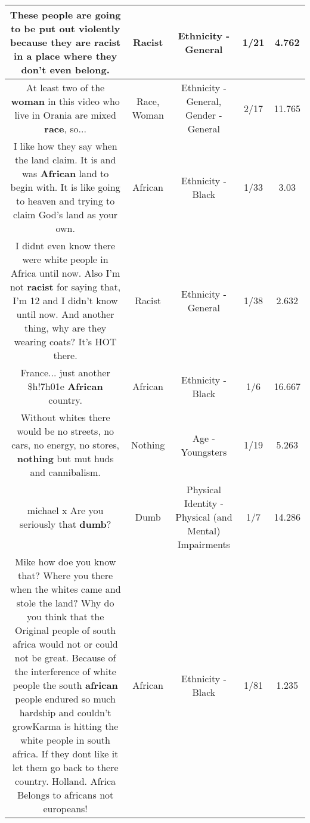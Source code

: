 \documentclass[11pt]{article}
\newlength\mylength
\begin{document}
\begin{center}
\begin{longtable}{|C{.65\mylength}|C{.30\mylength}|C{.12\mylength}|C{.12\mylength}|C{.12\mylength}|}
  \small These people are going to be put out violently because they are \textbf{racist} in a place where they don't even belong.\normalsize   & Racist & Ethnicity - General & 1/21 & 4.762 \\  \hline
  \small At least two of the \textbf{woman} in this video who live in Orania are mixed \textbf{race}, so...\normalsize   & Race, Woman & Ethnicity - General, Gender - General & 2/17 & 11.765 \\  \hline
  \small I like how they say when the land claim. It is and was \textbf{African} land to begin with. It is like going to heaven and trying to claim God's land as your own.\normalsize   & African & Ethnicity - Black & 1/33 & 3.03 \\  \hline
  \small I didnt even know there were white people in Africa until now. Also I'm not \textbf{racist} for saying that, I'm 12 and I didn't know until now. And another thing, why are they wearing coats? It's HOT there.\normalsize   & Racist & Ethnicity - General & 1/38 & 2.632 \\  \hline
  \small France... just another \$h!7h01e \textbf{African} country.\normalsize   & African & Ethnicity - Black & 1/6 & 16.667 \\  \hline
  \small Without whites there would be no streets, no cars, no energy, no stores, \textbf{nothing} but mut huds and cannibalism.\normalsize   & Nothing & Age - Youngsters & 1/19 & 5.263 \\  \hline
  \small michael x Are you seriously that \textbf{dumb}?\normalsize   & Dumb & Physical Identity - Physical (and Mental) Impairments & 1/7 & 14.286 \\  \hline
  \small Mike how doe you know that? Where you there when the whites came and stole the land? Why do you think that the Original people of south africa would not or could not be great. Because of the interference of white people the south \textbf{african} people endured so much hardship and couldn't growKarma is hitting the white people in south africa. If they dont like it let them go back to there country. Holland. Africa Belongs to africans not europeans!\normalsize   & African & Ethnicity - Black & 1/81 & 1.235 \\  \hline

\end{longtable}
\end{center}
\end{document}
